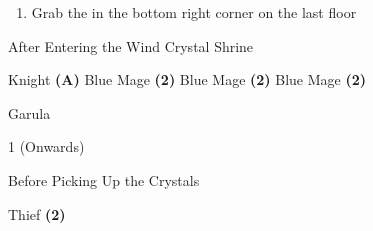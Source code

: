 \begin{paracol}{2}
\switchcolumn
\resume
\begin{enumerate}[resume]
    \item Grab the  in the bottom right corner on the last floor
\end{enumerate}

\begin{menu}{After Entering the Wind Crystal Shrine}
	\varwb
    \begin{jobMenu}
        \faris Knight \textbf{(A)}
        \galuf Blue Mage \textbf{(2\pointLeft)} \optimize
        \lenna Blue Mage \textbf{(2\pointLeft)} \optimize
        \bartz Blue Mage \textbf{(2\pointLeft)} \optimize
	\end{jobMenu}
    \begin{itemMenu}
        \potionMenu {}
    \end{itemMenu}
    \varwe
\end{menu}

\begin{boss}{Garula}
    \varwb
    \begin{round}{1 (Onwards)}
        \faris \leftCommand{\guard}
        \everyoneElse \leftCommand{\blue} \then \goblinPunch
    \end{round}
    \varwe
\end{boss}

\begin{menu}{Before Picking Up the Crystals}
	\varwb
    \begin{jobMenu}
        \bartz Thief \textbf{(2\pointRight)} \ability{!\black} \optimize
	\end{jobMenu}
    \varwe
\end{menu}

\end{paracol}